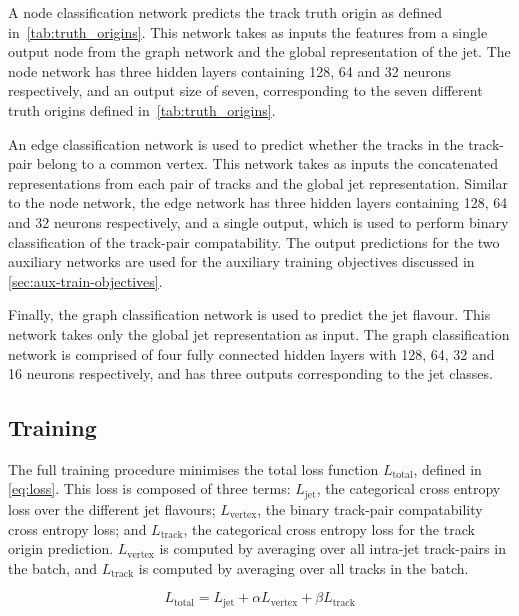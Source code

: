 A node classification network predicts the track truth origin as defined in~\cref{tab:truth_origins}.
This network takes as inputs the features from a single output node from the graph network and the global representation of the jet.
The node network has three hidden layers containing 128, 64 and 32 neurons respectively, and an output size of seven, corresponding to the seven different truth origins defined in~\cref{tab:truth_origins}.

An edge classification network is used to predict whether the tracks in the track-pair belong to a common vertex.
This network takes as inputs the concatenated representations from each pair of tracks and the global jet representation.
Similar to the node network, the edge network has three hidden layers containing 128, 64 and 32 neurons respectively, and a single output, which is used to perform binary classification of the track-pair compatability.
The output predictions for the two auxiliary networks are used for the auxiliary training objectives discussed in \cref{sec:aux-train-objectives}.

Finally, the graph classification network is used to predict the jet flavour.
This network takes only the global jet representation as input.
The graph classification network is comprised of four fully connected hidden layers with 128, 64, 32 and 16 neurons respectively, and has three outputs corresponding to the \bcl jet classes. 



\subsection{Training}\label{sec:training}

The full \GNN training procedure minimises the total loss function $L_\text{total}$, defined in \cref{eq:loss}. 
This loss is composed of three terms: $L_\text{jet}$, the categorical cross entropy loss over the different jet flavours; $L_\text{vertex}$, the binary track-pair compatability cross entropy loss; and $L_\text{track}$, the categorical cross entropy loss for the track origin prediction.
$L_\text{vertex}$ is computed by averaging over all intra-jet track-pairs in the batch, and $L_\text{track}$ is computed by averaging over all tracks in the batch.

\begin{equation}\label{eq:loss}
    L_\text{total} = L_\text{jet} + \alpha L_\text{vertex} + \beta L_\text{track}
\end{equation}

